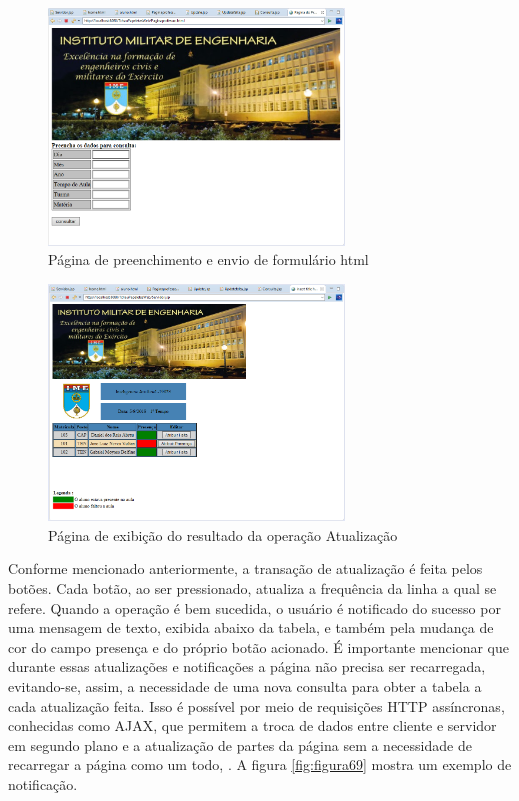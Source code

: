 \begin{figure}[!ht]
	\centering
\includegraphics[width=0.70\textwidth]{img/pagina_de_consulta.png}   
	\caption{Página de preenchimento e envio de formulário html}
	\label{fig:figura67}
\end{figure}

\begin{figure}[!ht]
	\centering
\includegraphics[width=0.70\textwidth]{img/servidorjsp.png}   
	\caption{Página de exibição do resultado da operação Atualização}
	\label{fig:figura68}
\end{figure}


Conforme mencionado anteriormente, a transação de atualização é feita pelos botões. Cada botão, ao ser pressionado, atualiza a frequência da linha a qual se refere. Quando a operação é bem sucedida, o usuário é notificado do sucesso por uma mensagem de texto, exibida abaixo da tabela, e também pela mudança de cor do campo presença e do próprio botão acionado. É importante mencionar que durante essas atualizações e notificações a página não precisa ser recarregada, evitando-se, assim, a necessidade de uma nova consulta para obter a tabela a cada atualização feita. Isso é possível por meio de requisições HTTP assíncronas, conhecidas como AJAX, que permitem a troca de dados entre cliente e servidor em segundo plano e a atualização de partes da página sem a necessidade de recarregar a página como um todo, \citep{W3}. A figura \ref{fig:figura69} mostra um exemplo de notificação. 

